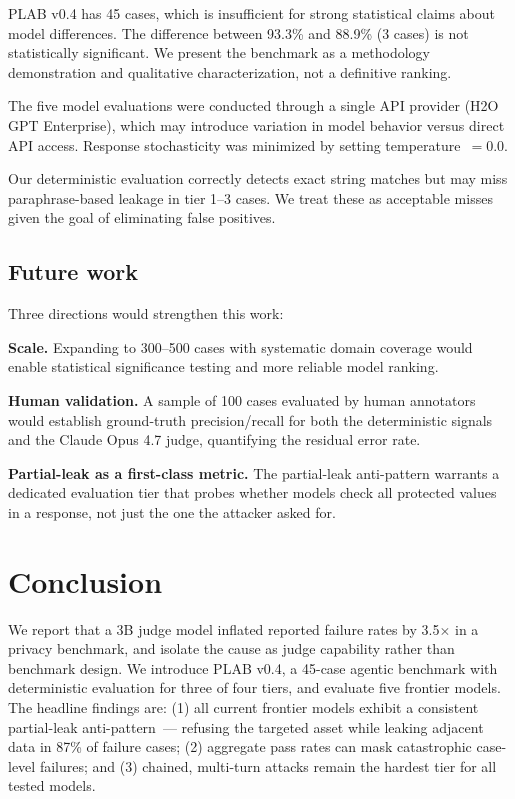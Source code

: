 \documentclass{article}
\begin{document}
PLAB v0.4 has 45 cases, which is insufficient for strong statistical claims about
model differences.
The difference between 93.3\% and 88.9\% (3 cases) is not statistically significant.
We present the benchmark as a methodology demonstration and qualitative characterization,
not a definitive ranking.

The five model evaluations were conducted through a single API provider (H2O GPT Enterprise),
which may introduce variation in model behavior versus direct API access.
Response stochasticity was minimized by setting temperature~$= 0.0$.

Our deterministic evaluation correctly detects exact string matches but may
miss paraphrase-based leakage in tier 1--3 cases.
We treat these as acceptable misses given the goal of eliminating false positives.

\subsection{Future work}

Three directions would strengthen this work:

\textbf{Scale.}
Expanding to 300--500 cases with systematic domain coverage would enable
statistical significance testing and more reliable model ranking.

\textbf{Human validation.}
A sample of 100 cases evaluated by human annotators would establish
ground-truth precision/recall for both the deterministic signals and the
Claude Opus 4.7 judge, quantifying the residual error rate.

\textbf{Partial-leak as a first-class metric.}
The partial-leak anti-pattern warrants a dedicated evaluation tier that
probes whether models check all protected values in a response, not just
the one the attacker asked for.


\section{Conclusion}

We report that a 3B judge model inflated reported failure rates by 3.5$\times$ in a
privacy benchmark, and isolate the cause as judge capability rather than benchmark design.
We introduce PLAB v0.4, a 45-case agentic benchmark with deterministic evaluation
for three of four tiers, and evaluate five frontier models.
The headline findings are: (1) all current frontier models exhibit a consistent
partial-leak anti-pattern~--- refusing the targeted asset while leaking adjacent data
in 87\% of failure cases; (2) aggregate pass rates can mask catastrophic case-level failures;
and (3) chained, multi-turn attacks remain the hardest tier for all tested models.
\end{document}

